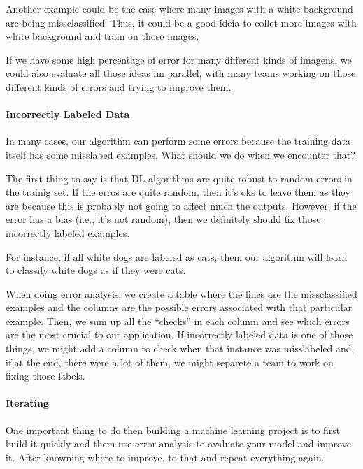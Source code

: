 \documentclass[12pt, a4paper, oneside]{book}
\begin{document}
Another example could be the case where many images with a white background are
being missclassified. Thus, it could be a good ideia to collet more images with
white background and train on those images.

If we have some high percentage of error for many different kinds of imagens, we
could also evaluate all those ideas im parallel, with many teams working on
those different kinds of errors and trying to improve them.

\paragraph{Incorrectly Labeled Data}%
\label{par:incorrectly_labeled_data}

In many cases, our algorithm can perform some errors because the training data
itself has some misslabed examples. What should we do when we encounter that?

The first thing to say is that DL algorithms are quite robust to random errors
in the trainig set. If the erros are quite random, then it's oks to leave them
as they are because this is probably not going to affect much the outputs.
However, if the error has a bias (i.e., it's not random), then we definitely
should fix those incorrectly labeled examples.

For instance, if all white dogs are labeled as cats, them our algorithm will
learn to classify white dogs as if they were cats.

When doing error analysis, we create a table where the lines are the
missclassified examples and the columns are the possible errors associated with
that particular example. Then, we sum up all the ``checks'' in each column and
see which errors are the most crucial to our application. If incorrectly labeled
data is one of those things, we might add a column to check when that instance
was misslabeled and, if at the end, there were a lot of them, we might separete
a team to work on fixing those labels.

\paragraph{Iterating}%
\label{par:iterating}

One important thing to do then building a machine learning project is to first
build it quickly and them use error analysis to avaluate your model and improve
it. After knowning where to improve, to that and repeat everything again.
\end{document}
